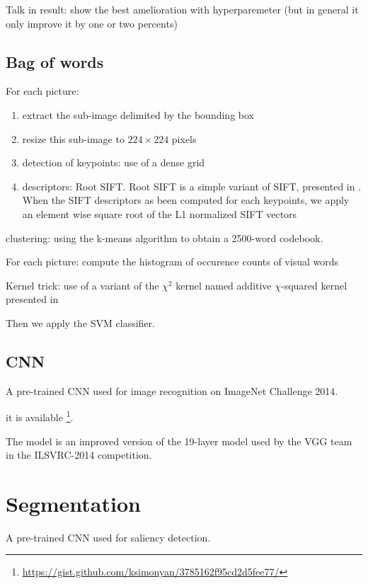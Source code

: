 Talk in result: show the best amelioration with hyperparemeter (but in general it only improve it by one or two percents)

\subsection{Bag of words}

For each picture:
\begin{enumerate}
    \item extract the sub-image delimited by the bounding box
    \item resize this sub-image to $224 \times 224$ pixels
    \item detection of keypoints: use of a dense grid
    \item descriptors: Root SIFT. Root SIFT is a simple variant of SIFT, presented in \cite{Arandjelovic2012}. When the SIFT descriptors as been computed for each keypoints, we apply an element wise square root of the L1 normalized SIFT vectors
\end{enumerate}

clustering: using the k-means algorithm to obtain a 2500-word codebook.

For each picture:
compute the histogram of occurence counts of visual words

Kernel trick: use of a variant of the $\chi^2$ kernel named additive $\chi$-squared kernel presented in \cite{Vedaldi2010}

Then we apply the SVM classifier.

\subsection{CNN}

A pre-trained CNN used for image recognition on ImageNet Challenge 2014.

\cite{Simonyan2014}

it is available \footnote{\url{https://gist.github.com/ksimonyan/3785162f95cd2d5fee77/}}.

The model is an improved version of the 19-layer model used by the VGG team in the ILSVRC-2014 competition.

\section{Segmentation}

A pre-trained CNN used for saliency detection.

\cite{zhang2015SOD}

